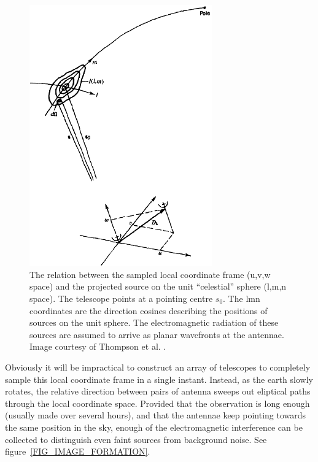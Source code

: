 \documentclass[a4paper, two column]{article}
\begin{document}
\begin{figure}[h]
 \begin{mdframed}
 \centering
 \includegraphics[width=0.7\textwidth]{lmn_uvw.png}
 \caption[The relation between image space and visibilities]{The relation between the sampled local coordinate frame (u,v,w space) and the projected source on the unit ``celestial'' 
 sphere (l,m,n space). The telescope points at a pointing centre $s_0$. The lmn coordinates are the direction cosines describing the positions of sources on the unit sphere. The electromagnetic radiation
 of these sources are assumed to arrive as planar wavefronts at the antennae. Image courtesy of Thompson et al. \cite{thompson2008interferometry}.}
  \label{FIG_APERTURE_SYNTH}
 \end{mdframed}
\end{figure}

Obviously it will be impractical to construct an array of telescopes to completely sample this local coordinate frame in a single instant. Instead, as the earth slowly rotates, the 
relative direction between pairs of antenna sweeps out eliptical paths through the local coordinate space. Provided that the observation is long enough (usually made over several hours), 
and that the antennae keep pointing towards the same position in the sky, enough of the electromagnetic interference can be collected to distinguish even faint sources from 
background noise. See figure~\ref{FIG_IMAGE_FORMATION}.
\end{document}
